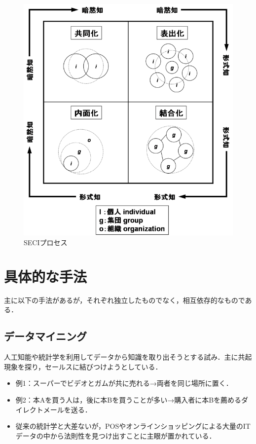 \begin{figure}[H]
\centering
\includegraphics[width=15cm]{SECI_pro.PNG}
\caption{SECIプロセス}\label{サンプル図}
\end{figure}


\section{具体的な手法}
主に以下の手法があるが，それぞれ独立したものでなく，相互依存的なものである\cite{management}．
\subsection{データマイニング}
人工知能や統計学を利用してデータから知識を取り出そうとする試み．主に共起現象を探り，セールスに結びつけようとしている．

\begin{itemize}
  \item 例1：スーパーでビデオとガムが共に売れる→両者を同じ場所に置く．
  \item 例2：本Aを買う人は，後に本Bを買うことが多い→購入者に本Bを薦めるダイレクトメールを送る．
  \item 従来の統計学と大差ないが，POSやオンラインショッピングによる大量のITデータの中から法則性を見つけ出すことに主眼が置かれている\cite{management}．
\end{itemize}

